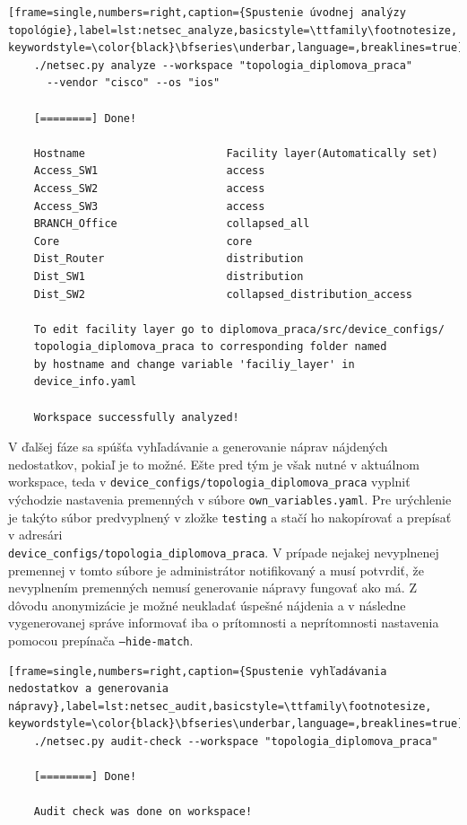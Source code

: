 \begin{minipage}{\linewidth}		
	\begin{lstlisting}[frame=single,numbers=right,caption={Spustenie úvodnej analýzy topológie},label=lst:netsec_analyze,basicstyle=\ttfamily\footnotesize, keywordstyle=\color{black}\bfseries\underbar,language=,breaklines=true]
	./netsec.py analyze --workspace "topologia_diplomova_praca" 
	  --vendor "cisco" --os "ios"
	
	[========] Done!
	
	Hostname                      Facility layer(Automatically set)
	Access_SW1                    access
	Access_SW2                    access
	Access_SW3                    access
	BRANCH_Office                 collapsed_all
	Core                          core
	Dist_Router                   distribution
	Dist_SW1                      distribution
	Dist_SW2                      collapsed_distribution_access
	
	To edit facility layer go to diplomova_praca/src/device_configs/
	topologia_diplomova_praca to corresponding folder named 
	by hostname and change variable 'faciliy_layer' in 
	device_info.yaml
	
	Workspace successfully analyzed!
	\end{lstlisting}
\end{minipage}
\newpage
\vspace{2em}
V ďalšej fáze sa spúšťa vyhľadávanie a generovanie náprav nájdených nedostatkov, pokiaľ je to možné. Ešte pred tým je však nutné v aktuálnom workspace, teda v \texttt{device\_configs/topologia\_diplomova\_praca} vyplniť východzie nastavenia premenných v súbore \texttt{own\_variables.yaml}. Pre urýchlenie je takýto súbor predvyplnený v zložke \texttt{testing} a stačí ho nakopírovať a prepísať v adresári\\ \texttt{device\_configs/topologia\_diplomova\_praca}. V prípade nejakej nevyplnenej premennej v tomto súbore je administrátor notifikovaný a musí potvrdiť, že nevyplnením premenných nemusí generovanie nápravy fungovať ako má. Z dôvodu anonymizácie je možné neukladať úspešné nájdenia a v následne vygenerovanej správe informovať iba o prítomnosti a neprítomnosti nastavenia pomocou prepínača \texttt{---hide-match}.

\begin{minipage}{\linewidth}		
	\begin{lstlisting}[frame=single,numbers=right,caption={Spustenie vyhľadávania nedostatkov a generovania nápravy},label=lst:netsec_audit,basicstyle=\ttfamily\footnotesize, keywordstyle=\color{black}\bfseries\underbar,language=,breaklines=true]
	./netsec.py audit-check --workspace "topologia_diplomova_praca"
	
    [========] Done!
    
    Audit check was done on workspace!
	\end{lstlisting}
\end{minipage}

